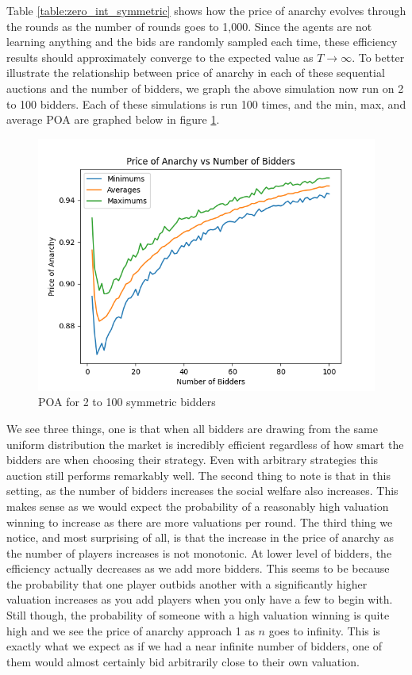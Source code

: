 \documentclass[12pt,twoside]{reedthesis}
\begin{document}
Table \ref{table:zero_int_symmetric} shows how the price of anarchy evolves through the rounds as the number of rounds goes to 1,000. Since the agents are not learning anything and the bids are randomly sampled each time, these efficiency results should approximately converge to the expected value as $T \rightarrow \infty$. To better illustrate the relationship between price of anarchy in each of these sequential auctions and the number of bidders, we graph the above simulation now run on 2 to 100 bidders. Each of these simulations is run 100 times, and the min, max, and average POA are graphed below in figure \ref{zi_symmetric}.

\begin{figure}[h!]
	\centering
	\includegraphics[scale=.8]{Figures/zi_symmetric}
	\caption{POA for 2 to 100 symmetric bidders}
	\label{zi_symmetric}
\end{figure}
 

 We see three things, one is that when all bidders are drawing from the same uniform distribution the market is incredibly efficient regardless of how smart the bidders are when choosing their strategy. Even with arbitrary strategies this auction still performs remarkably well. The second thing to note is that in this setting, as the number of bidders increases the social welfare also increases. This makes sense as we would expect the probability of a reasonably high valuation winning to increase as there are  more valuations per round. The third thing we notice, and most surprising of all, is that the increase in the price of anarchy as the number of players increases is not monotonic. At lower level of bidders, the efficiency actually decreases as we add more bidders. This seems to be because the probability that one player outbids another with a significantly higher valuation increases as you add players when you only have a few to begin with. Still though, the probability of someone with a high valuation winning is quite high and we see the price of anarchy approach 1 as $n$ goes to infinity. This is exactly what we expect as if we had a near infinite number of bidders, one of them would almost certainly bid arbitrarily close to their own valuation. 
\end{document}
